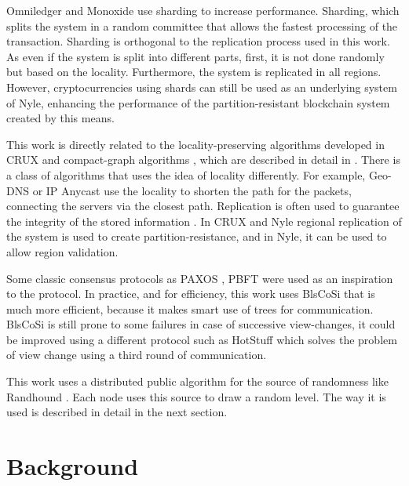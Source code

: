 \documentclass[a4paper,11pt,twoside=semi,openright]{report}
\begin{document}
Omniledger \cite{Kokoris-Kogias2017} and Monoxide \cite{Wang2019} use sharding
to increase performance. Sharding, which splits the system in a random
committee that allows the fastest processing of the transaction. Sharding is
orthogonal to the replication process used in this work. As even if the system
is split into different parts, first, it is not done randomly but based on the
locality. Furthermore, the system is replicated in all regions. However,
cryptocurrencies using shards can still be used as an underlying system of
Nyle, enhancing the performance of the partition-resistant blockchain system
created by this means.

This work is directly related to the locality-preserving algorithms developed
in CRUX \cite{Basescu2014} and compact-graph algorithms \cite{Thorup2005},
which are described in detail in . There is a class of
algorithms that uses the idea of locality differently. For example, Geo-DNS
\cite{Katz-bassett2006} or IP Anycast \cite{Abley2006} use the locality to
shorten the path for the packets, connecting the servers via the closest path.
Replication is often used to guarantee the integrity of the stored information
\cite{Mokadem2015}. In CRUX \cite{Basescu2014} and Nyle regional replication of
the system is used to create partition-resistance, and in Nyle, it can be used
to allow region validation.

Some classic consensus protocols as PAXOS \cite{Lamport2000}, PBFT
\cite{Castro1999} were used as an inspiration to the protocol. In practice, and
for efficiency, this work uses BlsCoSi \cite{Boneh2018} that is much more
efficient, because it makes smart use of trees for communication. BlsCoSi
\cite{Boneh2018} is still prone to some failures in case of successive
view-changes, it could be improved using a different protocol such as HotStuff
\cite{Yin2018} which solves the problem of view change using a third round of
communication. 

This work uses a distributed public algorithm for the source of randomness like
Randhound \cite{Syta2016}. Each node uses this source to draw a random level.
The way it is used is described in detail in the next section. 


\chapter{Background} \label{chap:Background} %
\end{document}
